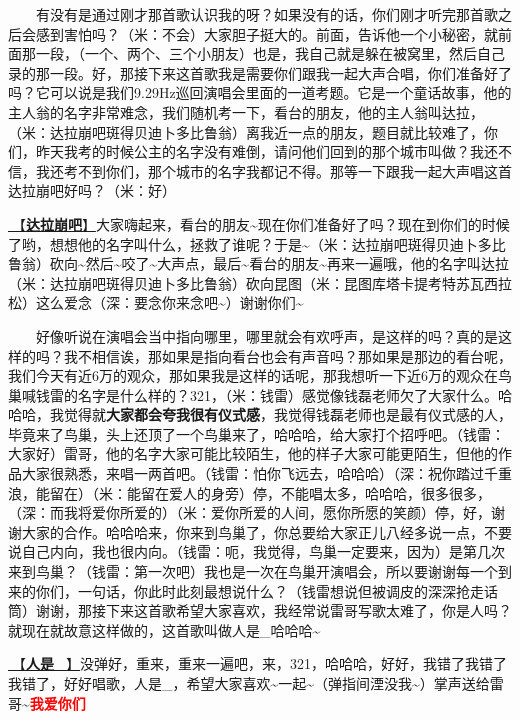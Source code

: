 \documentclass[]{ctexbook}
\begin{document}
  有没有是通过刚才那首歌认识我的呀？如果没有的话，你们刚才听完那首歌之后会感到害怕吗？（米：不会）大家胆子挺大的。前面，告诉他一个小秘密，就前面那一段，（一个、两个、三个小朋友）也是，我自己就是躲在被窝里，然后自己录的那一段。好，那接下来这首歌我是需要你们跟我一起大声合唱，你们准备好了吗？它可以说是我们9.29Hz巡回演唱会里面的一道考题。它是一个童话故事，他的主人翁的名字非常难念，我们随机考一下，看台的朋友，他的主人翁叫达拉，（米：达拉崩吧斑得贝迪卜多比鲁翁）离我近一点的朋友，题目就比较难了，你们，昨天我考的时候公主的名字没有难倒，请问他们回到的那个城市叫做？我还不信，我还考不到你们，那个城市的名字我都记不得。那等一下跟我一起大声唱这首达拉崩吧好吗？（米：好）

\hyperref[dalabengba]{🎵【\textbf{达拉崩吧}】}大家嗨起来，看台的朋友\textasciitilde 现在你们准备好了吗？现在到你们的时候了哟，想想他的名字叫什么，拯救了谁呢？于是\textasciitilde（米：达拉崩吧斑得贝迪卜多比鲁翁）砍向\textasciitilde 然后\textasciitilde 咬了\textasciitilde 大声点，最后\textasciitilde 看台的朋友\textasciitilde 再来一遍哦，他的名字叫达拉（米：达拉崩吧斑得贝迪卜多比鲁翁）砍向昆图（米：昆图库塔卡提考特苏瓦西拉松）这么爱念（深：要念你来念吧\textasciitilde）谢谢你们\textasciitilde{}

  好像听说在演唱会当中指向哪里，哪里就会有欢呼声，是这样的吗？真的是这样的吗？我不相信诶，那如果是指向看台也会有声音吗？那如果是那边的看台呢，我们今天有近6万的观众，那如果我是这样的话呢，那我想听一下近6万的观众在鸟巢喊钱雷的名字是什么样的？321，（米：钱雷）感觉像钱磊老师欠了大家什么。哈哈哈，我觉得就\textbf{大家都会夸我很有仪式感}，我觉得钱磊老师也是最有仪式感的人，毕竟来了鸟巢，头上还顶了一个鸟巢来了，哈哈哈，给大家打个招呼吧。（钱雷：大家好）雷哥，他的名字大家可能比较陌生，他的样子大家可能更陌生，但他的作品大家很熟悉，来唱一两首吧。（钱雷：怕你飞远去，哈哈哈）（深：祝你踏过千重浪，能留在）（米：能留在爱人的身旁）停，不能唱太多，哈哈哈，很多很多，（深：而我将爱你所爱的）（米：爱你所爱的人间，愿你所愿的笑颜）停，好，谢谢大家的合作。哈哈哈来，你来到鸟巢了，你总要给大家正儿八经多说一点，不要说自己内向，我也很内向。（钱雷：呃，我觉得，鸟巢一定要来，因为）是第几次来到鸟巢？（钱雷：第一次吧）我也是一次在鸟巢开演唱会，所以要谢谢每一个到来的你们，一句话，你此时此刻最想说什么？（钱雷想说但被调皮的深深抢走话筒）谢谢，那接下来这首歌希望大家喜欢，我经常说雷哥写歌太难了，你是人吗？就现在就故意这样做的，这首歌叫做人是\_哈哈哈\textasciitilde{}

\hyperref[renshi]{🎵【\textbf{人是\_}】}没弹好，重来，重来一遍吧，来，321，哈哈哈，好好，我错了我错了我错了，好好唱歌，人是\_，希望大家喜欢\textasciitilde 一起\textasciitilde（弹指间湮没我\textasciitilde）掌声送给雷哥\textasciitilde{}\textbf{\textcolor{red}{我爱你们~} }
\end{document}
